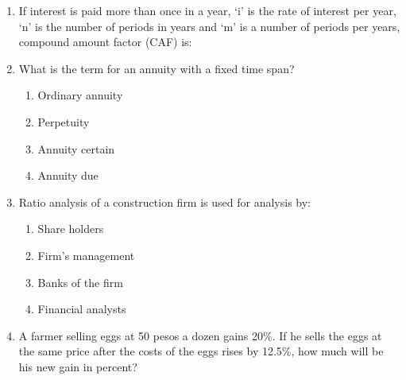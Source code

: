 \documentclass[11pt,a4paper]{article}
\begin{document}
\begin{enumerate}
\item{If interest is paid more than once in a year, `i' is the rate of interest per year, `n' is the number of periods in years and `m' is a number of periods per years, compound amount factor (CAF) is:
}
\\
\item{What is the term for an annuity with a fixed time span?}
\begin{enumerate}[label=\Alph*.]
\item{Ordinary annuity}
\item{Perpetuity}
\item{Annuity certain}
\item{Annuity due}
\end{enumerate}
\item{Ratio analysis of a construction firm is used for analysis by:}
\begin{enumerate}[label=\Alph*.]
\item{Share holders}
\item{Firm's management}
\item{Banks of the firm}
\item{Financial analysts}
\end{enumerate}
\item{A farmer selling eggs at 50 pesos a dozen gains 20\%. If he sells the eggs at the same price after the costs of the eggs rises by 12.5\%, how much will be his new gain in percent?}
\\
\end{enumerate}
\end{document}
